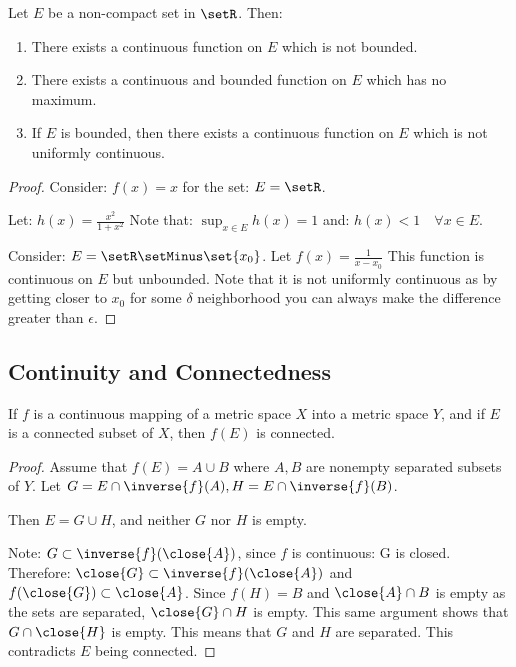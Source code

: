 \documentclass[12pt, letterpaper]{paper}
\begin{document}
\begin{theorem}
  \label{thr:4.20}
  Let $E$ be a non-compact set in $\setR$. Then:
  \begin{enumerate}
  \item There exists a continuous function on $E$ which is not
    bounded.
  \item There exists a continuous and bounded function on $E$ which
    has no maximum.
      
  \item If $E$ is bounded, then there exists a continuous function on
    $E$ which is not uniformly continuous.
  \end{enumerate}
  \begin{proof}
  \item Consider: $f(x) = x$ for the set: $E = \setR$.
  \item Let: $h(x) = \frac{x^2}{1+x^2}$ Note that:
    $\sup_{x \in E} h(x) = 1$ and: $h(x) < 1 \quad \forall x \in E$.
  \item Consider: $E = \setR \setMinus \set{x_0}$. Let
    $f(x) = \frac{1}{x-x_0}$ This function is continuous on $E$ but
    unbounded. Note that it is not uniformly continuous as by getting
    closer to $x_0$ for some $\delta$ neighborhood you can always make the
    difference greater than $\epsilon$.
  \end{proof}
\end{theorem}

\subsection{Continuity and Connectedness}

\begin{theorem}
  \label{thr:4.22}
  If $f$ is a continuous mapping of a metric space $X$ into a metric
  space $Y$, and if $E$ is a connected subset of $X$, then $f(E)$ is
  connected.

    \begin{proof}
      Assume that $f(E) = A \cup B$ where $A,B$ are nonempty separated
      subsets of $Y$. Let
      $G = E \cap \inverse{f}(A), H = E \cap \inverse{f}(B)$.

      Then $E = G \cup H$, and neither $G$ nor $H$ is empty.

      Note: $G \subset \inverse{f}(\close{A})$, since $f$ is continuous: G
      is closed. Therefore: $\close{G} \subset \inverse{f}(\close{A})$ and
      $f(\close{G}) \subset \close{A}$. Since $f(H) = B$ and
      $\close{A} \cap B$ is empty as the sets are separated,
      $\close{G} \cap H$ is empty. This same argument shows that
      $G \cap \close{H}$ is empty. This means that $G$ and $H$ are
      separated. This contradicts $E$ being connected.
    \end{proof}
\end{theorem}
\end{document}
